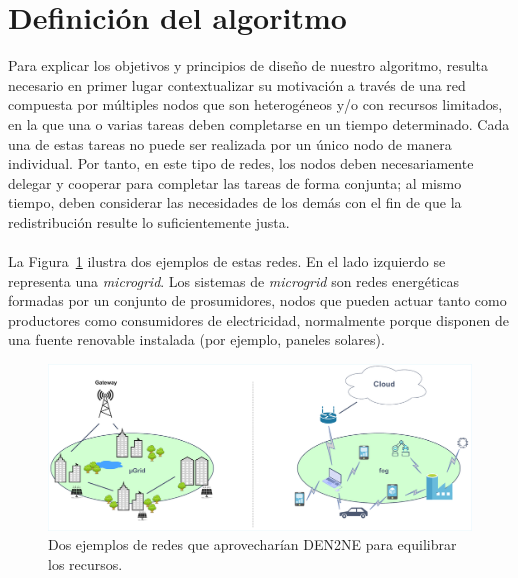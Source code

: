 \section{Definición del algoritmo}

Para explicar los objetivos y principios de diseño de nuestro algoritmo, resulta necesario en primer lugar contextualizar su motivación a través de una red compuesta por múltiples nodos que son heterogéneos y/o con recursos limitados, en la que una o varias tareas deben completarse en un tiempo determinado. Cada una de estas tareas no puede ser realizada por un único nodo de manera individual. Por tanto, en este tipo de redes, los nodos deben necesariamente delegar y cooperar para completar las tareas de forma conjunta; al mismo tiempo, deben considerar las necesidades de los demás con el fin de que la redistribución resulte lo suficientemente justa.\\
\\
La Figura~\ref{fig:den2ne_01} ilustra dos ejemplos de estas redes. En el lado izquierdo se representa una \textit{microgrid}. Los sistemas de \textit{microgrid} son redes energéticas formadas por un conjunto de prosumidores, nodos que pueden actuar tanto como productores como consumidores de electricidad, normalmente porque disponen de una fuente renovable instalada (por ejemplo, paneles solares).

\begin{figure}[ht!]
    \centering
    \includegraphics[width=\textwidth]{fig/05_den2ne/den2ne_01.drawio.pdf}
    \caption{Dos ejemplos de redes que aprovecharían DEN2NE para equilibrar los recursos.}
    \label{fig:den2ne_01}
\end{figure}

